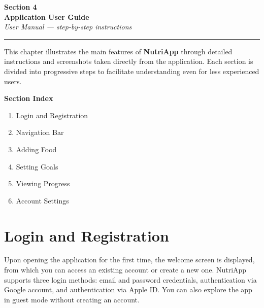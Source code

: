 \documentclass[a4paper,12pt]{article}
\begin{document}
\begin{center}
  {\Huge\bfseries\color{nutrigreen} Section 4}\\[6pt]
  {\Large\bfseries\color{nutridark} Application User Guide}\\[4pt]
  {\normalsize\itshape\color{nutrigray} User Manual --- step-by-step instructions}
\end{center}

\medskip
\noindent\rule{\textwidth}{1.5pt}{\color{nutrigreen}}
\medskip

\noindent This chapter illustrates the main features of \textbf{NutriApp}
through detailed instructions and screenshots taken directly from the application.
Each section is divided into progressive steps to facilitate understanding even
for less experienced users.

\medskip
\begin{infobox}
  \textbf{\color{nutrigreen}Section Index}
  \begin{enumerate}[leftmargin=1.4em, itemsep=2pt]
    \item Login and Registration
    \item Navigation Bar
    \item Adding Food
    \item Setting Goals
    \item Viewing Progress
    \item Account Settings
  \end{enumerate}
\end{infobox}

\newpage

\section{Login and Registration}

Upon opening the application for the first time, the welcome screen is displayed,
from which you can access an existing account or create a new one.
NutriApp supports three login methods: email and password credentials,
authentication via Google account, and authentication via Apple ID.
You can also explore the app in guest mode without creating an account.
\end{document}
